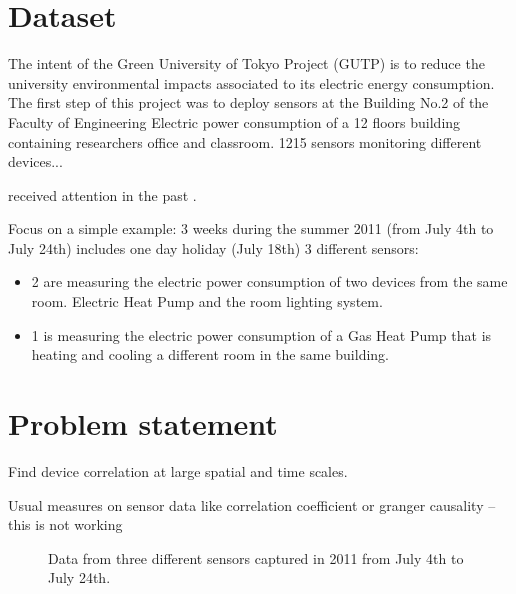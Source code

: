 \section{Dataset}
The intent of the Green University of Tokyo Project (GUTP) \cite{gutp} is to reduce the university environmental impacts associated to its electric energy consumption.
The first step of this project was to deploy sensors at the Building No.2 of the Faculty of Engineering 
Electric power consumption of a 12 floors building containing researchers office and classroom.
1215 sensors monitoring different devices...

received attention in the past \cite{ogawa:lncs2011}.

Focus on a simple example: 3 weeks during the summer 2011 (from July 4th to July 24th)
includes one day holiday (July 18th)
3 different sensors:
\begin{itemize}
 \item 2 are measuring the electric power consumption of two devices from the same room. Electric Heat Pump and the room lighting system.
 \item 1 is measuring the electric power consumption of a Gas Heat Pump that is heating and cooling a different room in the same building.
\end{itemize}

\section{Problem statement}\label{problem}
Find device correlation at large spatial and time scales.

Usual measures on sensor data like correlation coefficient or granger causality \cite{kim:buildsys2010}
-- this is not working


\begin{figure}
 \caption{Data from three different sensors captured in 2011 from July 4th to July 24th.}
 \label{fig:raw}
\end{figure}

